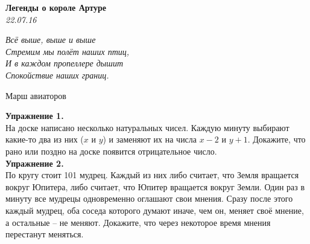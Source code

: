 \begin{center}
\textbf{\Large Легенды о короле Артуре}\\
\textit{22.07.16}
\end{center}

\epigraph{\it Всё выше, выше и выше\\
Стремим мы полёт наших птиц,\\
И в каждом пропеллере дышит\\
Спокойствие наших границ.}{Марш авиаторов}

\textbf{Упражнение 1.}\\
На доске написано несколько натуральных чисел. Каждую минуту выбирают какие-то два из них ($x$ и $y$) и заменяют их на числа $x-2$ и $y+1$. Докажите, что рано или поздно на доске появится отрицательное число.\\
\textbf{Упражнение 2.}\\
По кругу стоит 101 мудрец. Каждый из них либо считает, что Земля вращается вокруг Юпитера, либо считает, что Юпитер вращается вокруг Земли. Один раз в минуту все мудрецы одновременно оглашают свои мнения. Сразу после этого каждый мудрец, оба соседа которого думают иначе, чем он, меняет своё мнение, а остальные – не меняют. Докажите, что через некоторое время мнения перестанут меняться.

